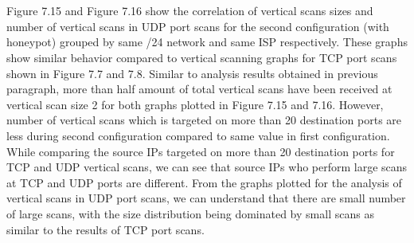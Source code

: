 \\\\
Figure 7.15 and Figure 7.16 show the correlation of vertical scans sizes and number of vertical scans in UDP port scans for the second configuration (with honeypot) grouped by same /24 network and same ISP respectively.
These graphs show similar behavior compared to  vertical scanning graphs for TCP port scans shown in Figure 7.7 and 7.8.
Similar to analysis results obtained in previous paragraph, more than half amount of total vertical scans have been received at vertical scan size 2 for both graphs plotted in Figure 7.15 and 7.16.
However, number of vertical scans which is targeted on more than 20 destination ports are less during second configuration compared to same value in first configuration.
While comparing the source IPs targeted on more than 20 destination ports for TCP and UDP vertical scans, we can see that
source IPs who perform large scans at TCP and UDP ports are different.
From the graphs plotted for the analysis of vertical scans in UDP port scans, we can understand that there are small number of large scans, with the size distribution being dominated by small scans as similar to the results of TCP port scans. 
